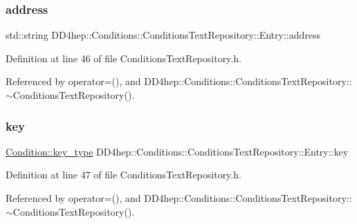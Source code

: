 \subsubsection{\texorpdfstring{address}{address}}
{\footnotesize\ttfamily std\+::string D\+D4hep\+::\+Conditions\+::\+Conditions\+Text\+Repository\+::\+Entry\+::address}



Definition at line 46 of file Conditions\+Text\+Repository.\+h.



Referenced by operator=(), and D\+D4hep\+::\+Conditions\+::\+Conditions\+Text\+Repository\+::$\sim$\+Conditions\+Text\+Repository().

\hypertarget{class_d_d4hep_1_1_conditions_1_1_conditions_text_repository_1_1_entry_a46681700774cfba80ad2c32ea18dd8dd}{}\label{class_d_d4hep_1_1_conditions_1_1_conditions_text_repository_1_1_entry_a46681700774cfba80ad2c32ea18dd8dd} 
\subsubsection{\texorpdfstring{key}{key}}
{\footnotesize\ttfamily \hyperlink{class_d_d4hep_1_1_conditions_1_1_condition_a7528efa762e8cc072ef80ea67c3531f9}{Condition\+::key\+\_\+type} D\+D4hep\+::\+Conditions\+::\+Conditions\+Text\+Repository\+::\+Entry\+::key}



Definition at line 47 of file Conditions\+Text\+Repository.\+h.



Referenced by operator=(), and D\+D4hep\+::\+Conditions\+::\+Conditions\+Text\+Repository\+::$\sim$\+Conditions\+Text\+Repository().

\hypertarget{class_d_d4hep_1_1_conditions_1_1_conditions_text_repository_1_1_entry_aacad5506cc8e8f5d9369ff635371a1f6}{}\label{class_d_d4hep_1_1_conditions_1_1_conditions_text_repository_1_1_entry_aacad5506cc8e8f5d9369ff635371a1f6} 

